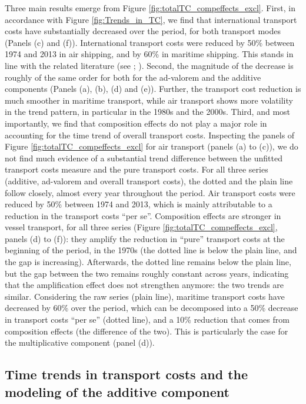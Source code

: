 \documentclass[a4paper,11pt]{article}
\begin{document}
Three main results emerge from Figure \ref{fig:totalTC_compeffects_excl}.
First, in accordance with Figure \ref{fig:Trends_in_TC}, we find that international transport costs have substantially decreased over the period, for both transport modes (Panels (c) and (f)).
International transport costs were reduced by 50\% between 1974 and 2013 in air shipping, and by 60\% in maritime shipping.
This stands in line with the related literature (see \citealp{Hummels_1999}; \citealp{Lafourcade_Thisse}).
Second, the magnitude of the decrease is roughly of the same order for both for the ad-valorem and the additive components (Panels (a), (b), (d) and (e)).
Further, the transport cost reduction is much smoother in maritime transport, while air transport shows more volatility in the trend pattern, in particular in the 1980s and the 2000s.
Third, and most importantly, we find that composition effects do not play a major role in accounting for the time trend of overall transport costs.
Inspecting the panels of Figure \ref{fig:totalTC_compeffects_excl} for air transport (panels (a) to (c)), we do not find much evidence of a substantial trend difference between the unfitted transport costs measure and the pure transport costs.
For all three series (additive, ad-valorem and overall transport costs), the dotted and the plain line follow closely, almost every year throughout the period.
Air transport costs were reduced by 50\% between 1974 and 2013, which is mainly attributable to a reduction in the transport costs ``per se''.
Composition effects are stronger in vessel transport, for all three series (Figure \ref{fig:totalTC_compeffects_excl}, panels (d) to (f)): they amplify the reduction in ``pure'' transport costs at the beginning of the period, in the 1970s (the dotted line is below the plain line, and the gap is increasing). Afterwards, the dotted line remains below the plain line, but the gap between the two remains roughly constant across years, indicating that the amplification effect does not strengthen anymore: the two trends are similar.
Considering the raw series (plain line), maritime transport costs have decreased by 60\% over the period, which can be decomposed into a 50\% decrease in transport costs ``per se'' (dotted line), and a 10\% reduction that comes from composition effects (the difference of the two).
This is particularly the case for the multiplicative component (panel (d)).\smallskip




\subsection{Time trends in transport costs and the modeling of the additive component}
\end{document}
